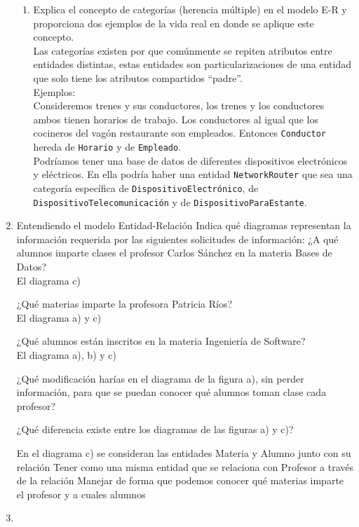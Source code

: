 \documentclass[12pt,a4paper]{article}
\begin{document}
\begin{enumerate}
\begin{enumerate}
			\item Explica el concepto de categorías (herencia múltiple) en el modelo E-R
				y proporciona dos ejemplos de la vida real en donde se aplique este concepto.\\

				Las categorías existen por que comúnmente se repiten atributos entre
				entidades distintas, estas entidades son particularizaciones de una entidad
				que solo tiene los atributos compartidos ``padre''.\\

				Ejemplos:\\
				Consideremos trenes y sus conductores, los trenes y los
				conductores ambos tienen horarios de trabajo. Los conductores
				al igual que los cocineros del vagón restaurante son empleados.
				Entonces \texttt{Conductor} hereda de \texttt{Horario} y de \texttt{Empleado}.\\

				Podríamos tener una base de datos de diferentes dispositivos electrónicos y eléctricos.
				En ella podría haber una entidad \texttt{NetworkRouter} que sea una categoría
				específica de \texttt{DispositivoElectrónico}, de \texttt{DispositivoTelecomunicación}
				y de \texttt{DispositivoParaEstante}.\\

		\end{enumerate}

	\item Entendiendo el modelo Entidad-Relación
 Indica qué diagramas representan la información requerida por las siguientes solicitudes de información: 
¿A qué alumnos imparte clases el profesor Carlos Sánchez en la materia Bases de Datos?\\
            El diagrama c)

¿Qué materias imparte la profesora Patricia Ríos?\\
	El diagrama a) y c)

¿Qué alumnos están inscritos en la materia Ingeniería de Software?\\
El diagrama a), b) y c)


¿Qué modificación harías en el diagrama de la figura a), sin perder información, para que se puedan conocer qué alumnos toman clase cada profesor?

¿Qué diferencia existe entre los diagramas de las figuras a) y c)?

En el diagrama c) se consideran las entidades Materia y Alumno junto con su               relación Tener como una misma entidad que se relaciona con Profesor a través de la   relación Manejar de forma que podemos conocer qué materias imparte el profesor y a cuales alumnos
\newpage
	\item 
	

\end{enumerate}
\end{document}
